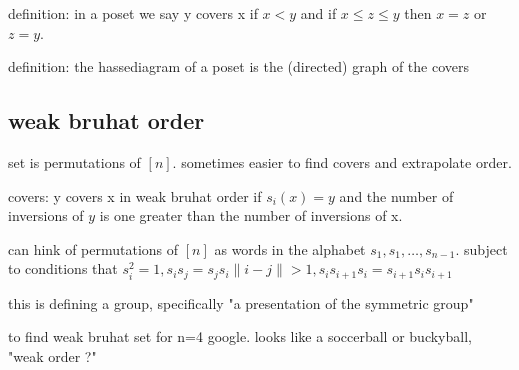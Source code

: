 \documentclass{article}
\begin{document}
definition: in a poset we say y covers x if $x<y$ and if $x\leq z\leq y$ then $x=z$ or $z=y$.

definition: the hassediagram of a poset is the (directed) graph of the covers


\subsection*{weak bruhat order}
set is permutations of $[n]$. sometimes easier to find covers and extrapolate order.

covers: y covers x in weak bruhat order if $s_i(x)=y$ and the number of inversions of $y$ is one greater than the number of inversions of x.

can hink of permutations of $[n]$ as words in the alphabet $s_1,s_1,\dots,s_{n-1}$. subject to conditions that $s_i^2=1,s_is_j=s_js_i \|i-j\|>1, s_is_{i+1}s_i=s_{i+1}s_is_{i+1}$

this is defining a group, specifically "a presentation of the symmetric group"

to find weak bruhat set for n=4 google. looks like a soccerball or buckyball, "weak order ?"
\end{document}
